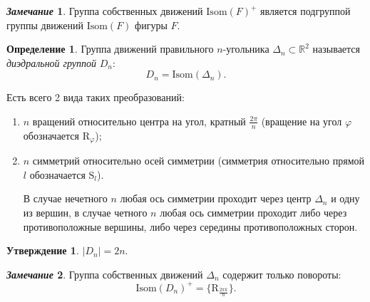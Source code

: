 \documentclass[a4paper, 14pt]{extarticle}
\newcommand{\n}{\par}
\newcommand{\real}{\mathbb{R}}
\newcommand{\Isom}{\mathrm{Isom}}
\newcommand{\Rot}{\mathrm{R}}
\newcommand{\Sym}{\mathrm{S}}
\renewcommand{\phi}{\varphi}
\theoremstyle{definition}
\newtheorem*{remark}{\textit{Замечание}}
\newtheorem{definition}{Определение}
\theoremstyle{plain}
\numberwithin{theorem}{section}
\numberwithin{definition}{section}
\newtheorem*{statement*}{Утверждение}
\numberwithin{statement}{section}
\numberwithin{lemma}{section}
\numberwithin{consequence}{section}
\begin{document}
		\begin{remark}
			Группа собственных движений ${\Isom(F)^+}$ является подгруппой группы движений ${\Isom(F)}$ фигуры $F.$
		\end{remark}
		\newpage
		\begin{definition}
			Группа движений правильного $n$-угольника ${\Delta_n \subset \real^2}$ называется \textit{диэдральной группой} $D_n{:}$
			\begin{equation*}
			 	D_n = \Isom(\Delta_n).
			\end{equation*} \n
		 	Есть всего 2 вида таких преобразований:
		 	\begin{enumerate}
				\setlength\itemsep{0.1em}
		 		\item $n$ вращений относительно центра на угол, кратный $\frac{2\pi}{n}$ (вращение на угол $\phi$ обозначается $\Rot_\phi$);
		 		\item $n$ симметрий относительно осей симметрии (симметрия относительно прямой $l$ обозначается $\Sym_l$). \n В случае нечетного $n$ любая ось симметрии проходит через центр $\Delta_n$ и одну из вершин, в случае четного $n$ любая ось симметрии проходит либо через противоположные вершины, либо через середины противоположных сторон. 
		 	\end{enumerate}
		\end{definition}
		\begin{statement*}
			${|D_n| = 2n.}$
		\end{statement*}
		\begin{remark}
			Группа собственных движений $\Delta_n$ содержит только повороты:
			\begin{equation*}
				\Isom(D_n)^+ = \{\Rot_{\frac{2\pi k}{n}}\}.
			\end{equation*}
		\end{remark}
\end{document}
